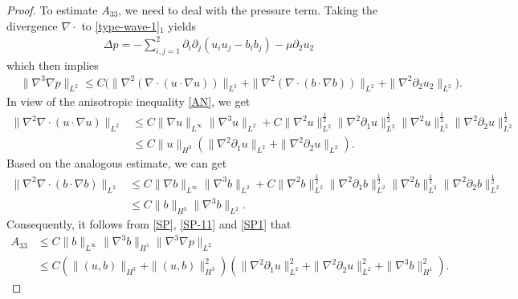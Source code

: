 \documentclass[reqno,11pt]{amsart}
\numberwithin{Thm}{section}
\begin{document}
\begin{proof}
To estimate $A_{33}$, we need to deal with the pressure term. Taking the divergence $\nabla\cdot$ to \eqref{type-wave-1}$_1$ yields
\begin{align}\label{p}
\Delta p=-\sum_{i,j=1}^2\partial_i\partial_j(u_i u_j-b_i b_j)-\mu\partial_2u_2
\end{align}
which then  implies
\begin{align}\label{SP}
&\|\nabla^3\nabla p\|_{L^2}
\leq C\big(\|\nabla^2(\nabla\cdot(u\cdot\nabla u))\|_{L^2}+\|\nabla^2(\nabla\cdot(b\cdot\nabla b))\|_{L^2}+\|\nabla^2\partial_2u_2\|_{L^2}\big).\end{align}
In view of the anisotropic inequality \eqref{AN}, we get
\begin{align}\label{SP-11}
\|\nabla^2\nabla\cdot(u\cdot\nabla u)\|_{L^2}&\leq C\|\nabla u\|_{L^{\infty}}\|\nabla^3u\|_{L^{2}}+C\|\nabla^2u\|_{L^{2}}^{\frac{1}{2}}\|\nabla^2\partial_{1}u\|_{L^{2}}^{\frac{1}{2}}
\|\nabla^2u\|_{L^{2}}^{\frac{1}{2}}\|\nabla^2\partial_{2}u\|_{L^{2}}^{\frac{1}{2}}\nonumber\\
&\leq C\|u\|_{H^{3}}(\|\nabla^2\partial_1u\|_{L^{2}}+\|\nabla^2\partial_2u\|_{L^{2}}).
\end{align}
Based on the analogous estimate, we can get
\begin{align}\label{SP1}
\|\nabla^2\nabla\cdot(b\cdot\nabla b)\|_{L^2}&\leq C\|\nabla b\|_{L^{\infty}}\|\nabla^3b\|_{L^{2}}
+C\|\nabla^2b\|_{L^{2}}^{\frac{1}{2}}\|\nabla^2\partial_{1}b\|_{L^{2}}^{\frac{1}{2}}
\|\nabla^2b\|_{L^{2}}^{\frac{1}{2}}\|\nabla^2\partial_{2}b\|_{L^{2}}^{\frac{1}{2}}\nonumber\\
&\leq C\| b\|_{H^{3}}\|\nabla^3b\|_{L^{2}}.
\end{align}
Consequently, it follows from \eqref{SP}, \eqref{SP-11} and \eqref{SP1} that
\begin{align}\label{A4}
A_{33}&\leq
C\| b\|_{L^{\infty}}\|\nabla^3 b\|_{H^1}\|\nabla^3\nabla p\|_{L^2}\nonumber\\
&\leq
C(\|(u,b)\|_{H^{3}}+\|(u,b)\|_{H^{3}}^2)\left(\|\nabla^2\partial_1u\|_{L^{2}}^2+\|\nabla^2\partial_2u\|_{L^{2}}^2+\|\nabla^3 b\|_{H^{1}}^2\right).
\end{align}





\end{proof}
\end{document}

